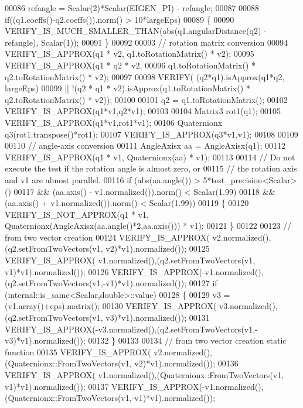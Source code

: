 \begin{DoxyCode}
00086     refangle = Scalar(2)*Scalar(EIGEN\_PI) - refangle;
00087 
00088   \textcolor{keywordflow}{if}((q1.coeffs()-q2.coeffs()).norm() > 10*largeEps)
00089   \{
00090     VERIFY\_IS\_MUCH\_SMALLER\_THAN(abs(q1.angularDistance(q2) - refangle), Scalar(1));
00091   \}
00092 
00093   \textcolor{comment}{// rotation matrix conversion}
00094   VERIFY\_IS\_APPROX(q1 * v2, q1.toRotationMatrix() * v2);
00095   VERIFY\_IS\_APPROX(q1 * q2 * v2,
00096     q1.toRotationMatrix() * q2.toRotationMatrix() * v2);
00097 
00098   VERIFY(  (q2*q1).isApprox(q1*q2, largeEps)
00099         || !(q2 * q1 * v2).isApprox(q1.toRotationMatrix() * q2.toRotationMatrix() * v2));
00100 
00101   q2 = q1.toRotationMatrix();
00102   VERIFY\_IS\_APPROX(q1*v1,q2*v1);
00103 
00104   Matrix3 rot1(q1);
00105   VERIFY\_IS\_APPROX(q1*v1,rot1*v1);
00106   Quaternionx q3(rot1.transpose()*rot1);
00107   VERIFY\_IS\_APPROX(q3*v1,v1);
00108 
00109 
00110   \textcolor{comment}{// angle-axis conversion}
00111   AngleAxisx aa = AngleAxisx(q1);
00112   VERIFY\_IS\_APPROX(q1 * v1, Quaternionx(aa) * v1);
00113 
00114   \textcolor{comment}{// Do not execute the test if the rotation angle is almost zero, or}
00115   \textcolor{comment}{// the rotation axis and v1 are almost parallel.}
00116   \textcolor{keywordflow}{if} (abs(aa.angle()) > 5*test\_precision<Scalar>()
00117       && (aa.axis() - v1.normalized()).norm() < Scalar(1.99)
00118       && (aa.axis() + v1.normalized()).norm() < Scalar(1.99))
00119   \{
00120     VERIFY\_IS\_NOT\_APPROX(q1 * v1, Quaternionx(AngleAxisx(aa.angle()*2,aa.axis())) * v1);
00121   \}
00122 
00123   \textcolor{comment}{// from two vector creation}
00124   VERIFY\_IS\_APPROX( v2.normalized(),(q2.setFromTwoVectors(v1, v2)*v1).normalized());
00125   VERIFY\_IS\_APPROX( v1.normalized(),(q2.setFromTwoVectors(v1, v1)*v1).normalized());
00126   VERIFY\_IS\_APPROX(-v1.normalized(),(q2.setFromTwoVectors(v1,-v1)*v1).normalized());
00127   \textcolor{keywordflow}{if} (internal::is\_same<Scalar,double>::value)
00128   \{
00129     v3 = (v1.array()+eps).matrix();
00130     VERIFY\_IS\_APPROX( v3.normalized(),(q2.setFromTwoVectors(v1, v3)*v1).normalized());
00131     VERIFY\_IS\_APPROX(-v3.normalized(),(q2.setFromTwoVectors(v1,-v3)*v1).normalized());
00132   \}
00133 
00134   \textcolor{comment}{// from two vector creation static function}
00135   VERIFY\_IS\_APPROX( v2.normalized(),(Quaternionx::FromTwoVectors(v1, v2)*v1).normalized());
00136   VERIFY\_IS\_APPROX( v1.normalized(),(Quaternionx::FromTwoVectors(v1, v1)*v1).normalized());
00137   VERIFY\_IS\_APPROX(-v1.normalized(),(Quaternionx::FromTwoVectors(v1,-v1)*v1).normalized());

\end{DoxyCode}
